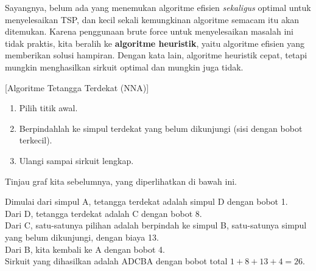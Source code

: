 Sayangnya, belum ada yang menemukan algoritme efisien \textit{sekaligus} optimal untuk menyelesaikan TSP, dan kecil sekali kemungkinan algoritme semacam itu akan ditemukan.  Karena penggunaan brute force untuk menyelesaikan masalah ini tidak praktis, kita beralih ke \textbf{algoritme heuristik}, yaitu algoritme efisien yang memberikan solusi hampiran.  Dengan kata lain, algoritme heuristik cepat, tetapi mungkin menghasilkan sirkuit optimal dan mungkin juga tidak.

\begin{algorithm}{}{}[Algoritme Tetangga Terdekat (NNA)]
\hspace{3in}
\begin{enumerate}
\item	Pilih titik awal.
\item	Berpindahlah ke simpul terdekat yang belum dikunjungi (sisi dengan bobot terkecil).
\item	Ulangi sampai sirkuit lengkap.
\end{enumerate}
\end{algorithm}

\begin{example}\label{graph17_ex} %
Tinjau graf kita sebelumnya, yang diperlihatkan di bawah ini.  

\begin{center}
\end{center}
\noindent Dimulai dari simpul A, tetangga terdekat adalah simpul D dengan bobot 1.\\
Dari D, tetangga terdekat adalah C dengan bobot 8.  \\
Dari C, satu-satunya pilihan adalah berpindah ke simpul B, satu-satunya simpul yang belum dikunjungi, dengan biaya 13.  \\
Dari B, kita kembali ke A dengan bobot 4.  \\

\noindent Sirkuit yang dihasilkan adalah ADCBA dengan bobot total $1+8+13+4 = 26$.
\end{example}

